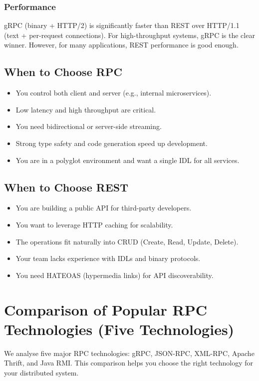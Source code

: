 \documentclass[a4paper]{article}
\begin{document}
\subsubsection{Performance}
gRPC (binary + HTTP/2) is significantly faster than REST over HTTP/1.1 (text + per-request connections). For high-throughput systems, gRPC is the clear winner. However, for many applications, REST performance is good enough.

\subsection{When to Choose RPC}
\begin{itemize}
    \item You control both client and server (e.g., internal microservices).
    \item Low latency and high throughput are critical.
    \item You need bidirectional or server-side streaming.
    \item Strong type safety and code generation speed up development.
    \item You are in a polyglot environment and want a single IDL for all services.
\end{itemize}

\subsection{When to Choose REST}
\begin{itemize}
    \item You are building a public API for third-party developers.
    \item You want to leverage HTTP caching for scalability.
    \item The operations fit naturally into CRUD (Create, Read, Update, Delete).
    \item Your team lacks experience with IDLs and binary protocols.
    \item You need HATEOAS (hypermedia links) for API discoverability.
\end{itemize}

\section{Comparison of Popular RPC Technologies (Five Technologies)}
We analyse five major RPC technologies: gRPC, JSON-RPC, XML-RPC, Apache Thrift, and Java RMI. This comparison helps you choose the right technology for your distributed system.
\end{document}
